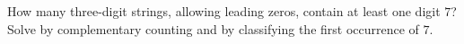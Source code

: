 How many three-digit strings, allowing leading zeros, contain at least one digit $7$? Solve by complementary counting and by classifying the first occurrence of $7$.
